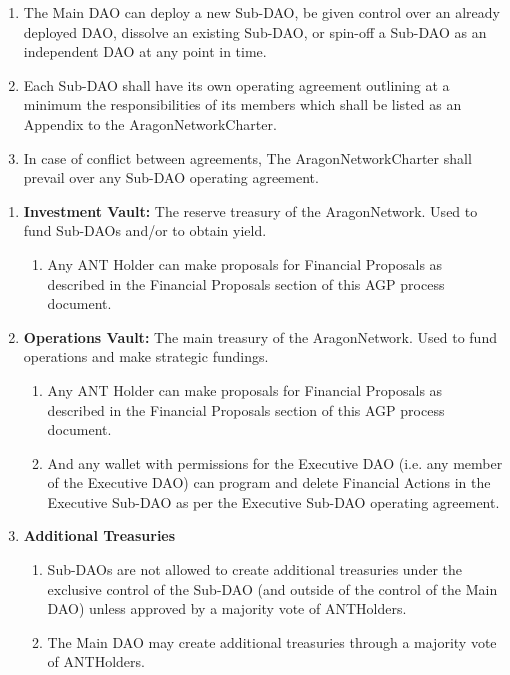 \begin{enumerate}
	\begin{enumerate}
		\item The Main \ac{DAO} can deploy a new Sub-\ac{DAO}, be given control over an already deployed \ac{DAO}, dissolve an existing Sub-\ac{DAO}, or spin-off a Sub-\ac{DAO} as an independent \ac{DAO} at any point in time.
		\item Each Sub-\ac{DAO} shall have its own operating agreement outlining at a minimum the responsibilities of its members which shall be listed as an Appendix to the \gls{AragonNetworkCharter}.
		\item In case of conflict between agreements, The \gls{AragonNetworkCharter} shall prevail over any Sub-\ac{DAO} operating agreement.
	\end{enumerate}

	\begin{enumerate}
			
		\item \textbf{Investment Vault:} The reserve treasury of the \gls{AragonNetwork}.
		Used to fund Sub-\acp{DAO} and/or to obtain yield.
		\begin{enumerate}
			\item Any \ac{ANT} Holder can make proposals for Financial Proposals as described in the Financial Proposals section of this \ac{AGP} process document.
		\end{enumerate}
		
		\item \textbf{Operations Vault:} The main treasury of the \gls{AragonNetwork}.
		Used to fund operations and make strategic fundings.
		\begin{enumerate}
			\item Any \ac{ANT} Holder can make proposals for Financial Proposals as
			described in the Financial Proposals section of this \ac{AGP} process
			document.
			\item And any wallet with permissions for the Executive \ac{DAO} (i.e. any member of the Executive \ac{DAO}) can program and delete Financial Actions in the Executive Sub-\ac{DAO} as per the Executive Sub-\ac{DAO} operating agreement.
		\end{enumerate}

		\item \textbf{Additional Treasuries}
		\begin{enumerate}
			\item Sub-\acp{DAO} are not allowed to create additional treasuries under the exclusive control of the Sub-\ac{DAO} (and outside of the control of the Main \ac{DAO}) unless approved by a majority vote of \glspl{ANTHolder}.
			\item The Main \ac{DAO} may create additional treasuries through a majority vote of \glspl{ANTHolder}.
		\end{enumerate}  
	

\end{enumerate}
\end{enumerate}
